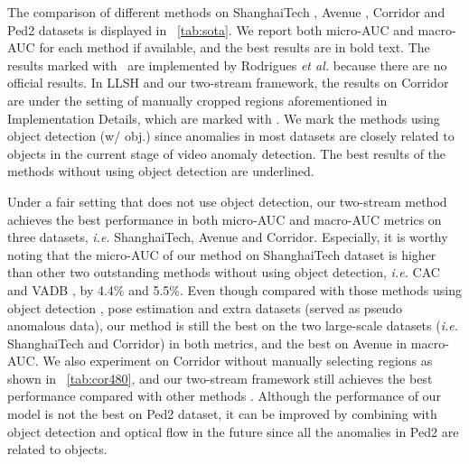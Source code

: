 \documentclass[lettersize,journal]{IEEEtran}
\begin{document}
The comparison of different methods on ShanghaiTech \cite{RevisitSparse2017luoa}, Avenue \cite{AbnormalEvent2013lua}, Corridor \cite{MultitimescaleTrajectory2020rodriguesa} and Ped2 \cite{AnomalyDetection2010mahadevan} datasets is displayed in \tablename~\ref{tab:sota}.
We report both micro-AUC and macro-AUC for each method if available, and the best results are in bold text.
The results marked with \tdar\, are implemented by Rodrigues \textit{et al.} \cite{MultitimescaleTrajectory2020rodriguesa} because there are no official results.
In LLSH \cite{LearnableLocalitySensitive2021lu} and our two-stream framework, the results on Corridor are under the setting of manually cropped regions aforementioned in Implementation Details, which are marked with \tddr.
We mark the methods using object detection (w/ obj.) since anomalies in most datasets are closely related to objects in the current stage of video anomaly detection.
The best results of the methods without using object detection are underlined.

Under a fair setting that does not use object detection, our two-stream method achieves the best performance in both micro-AUC and macro-AUC metrics on three datasets, \textit{i.e.} ShanghaiTech, Avenue and Corridor.
Especially, it is worthy noting that the micro-AUC of our method on ShanghaiTech dataset is higher than other two outstanding methods without using object detection, \textit{i.e.} CAC \cite{ClusterAttention2020wanga} and VADB \cite{VariationalAbnormal2022li}, by 4.4\% and 5.5\%.
Even though compared with those methods using object detection \cite{ObjectCentricAutoEncoders2019ionescua, ClozeTest2020yu, BackgroundAgnosticFramework2021georgescua, AnomalyDetection2021georgescua, HybridVideo2021liua, HierarchicalSpatioTemporal2021zeng}, pose estimation \cite{HierarchicalSpatioTemporal2021zeng} and extra datasets \cite{BackgroundAgnosticFramework2021georgescua} (served as pseudo anomalous data), our method is still the best on the two large-scale datasets (\textit{i.e.} ShanghaiTech and Corridor) in both metrics, and the best on Avenue in macro-AUC.
We also experiment on Corridor without manually selecting regions as shown in \tablename~\ref{tab:cor480}, and our two-stream framework still achieves the best performance compared with other methods \cite{FutureFrame2018liua, LearningRegularity2019moraisa, MultitimescaleTrajectory2020rodriguesa, HierarchicalSpatioTemporal2021zeng, VariationalAbnormal2022li}.
Although the performance of our model is not the best on Ped2 dataset, it can be improved by combining with object detection and optical flow in the future since all the anomalies in Ped2 are related to objects.
\end{document}
